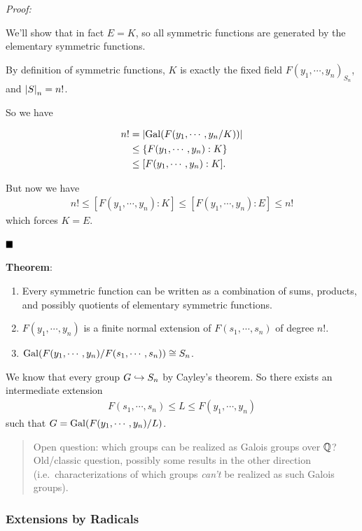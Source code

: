 \emph{Proof:}

We'll show that in fact \(E = K\), so all symmetric functions are
generated by the elementary symmetric functions.

By definition of symmetric functions, \(K\) is exactly the fixed field
\(F(y_1, \cdots, y_n)_{S_n}\), and \({\left\lvert {S} \right\rvert}_n = n!\).

So we have

\begin{align*}
n! &= {\left\lvert { \mathrm{Gal}(F(y_1, \cdots, y_n / K))} \right\rvert} \\
& \leq \{F(y_1, \cdots, y_n) : K\} \\
& \leq [F(y_1, \cdots, y_n): K]
.\end{align*}

But now we have
\begin{align*}
n! \leq [F(y_1, \cdots, y_n):K] \leq [F(y_1, \cdots, y_n) : E] \leq n!
\end{align*} which forces \(K=E\).

\(\qed\)

\textbf{Theorem}:

\begin{enumerate}
\def\labelenumi{\arabic{enumi}.}
\item
  Every symmetric function can be written as a combination of sums,
  products, and possibly quotients of elementary symmetric functions.
\item
  \(F(y_1, \cdots, y_n)\) is a finite normal extension of
  \(F(s_1, \cdots, s_n)\) of degree \(n!\).
\item
  \(\mathrm{Gal}(F(y_1, \cdots, y_n) / F(s_1, \cdots, s_n)) \cong S_n\).
\end{enumerate}

We know that every group \(G \hookrightarrow S_n\) by Cayley's theorem. So
there exists an intermediate extension
\begin{align*}
F(s_1, \cdots, s_n) \leq L \leq F(y_1, \cdots, y_n)
\end{align*} such that \(G = \mathrm{Gal}(F(y_1, \cdots, y_n) / L)\).

\begin{quote}
Open question: which groups can be realized as Galois groups over
\({\mathbb{Q}}\)? Old/classic question, possibly some results in the other
direction (i.e.~characterizations of which groups \emph{can't} be
realized as such Galois groups).
\end{quote}

\hypertarget{extensions-by-radicals}{%
\subsubsection{Extensions by Radicals}\label{extensions-by-radicals}}

